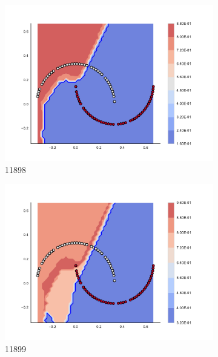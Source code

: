 \begin{figure}[h]
\begin{subfigure}[b]{0.09\textwidth}
    \includegraphics[clip, trim=2.35cm 1.75cm 4.5cm 0cm,width=\textwidth]{img/convergence/11898.pdf}
    \caption{11898}
    \label{fig:convergence_11898}
\end{subfigure}
%
\begin{subfigure}[b]{0.09\textwidth}
    \includegraphics[clip, trim=2.35cm 1.75cm 4.5cm 0cm,width=\textwidth]{img/convergence/11899.pdf}
    \caption{11899}
    \label{fig:convergence_11899}
\end{subfigure}
%
\begin{subfigure}[b]{0.09\textwidth}

\end{subfigure}
\end{figure}
